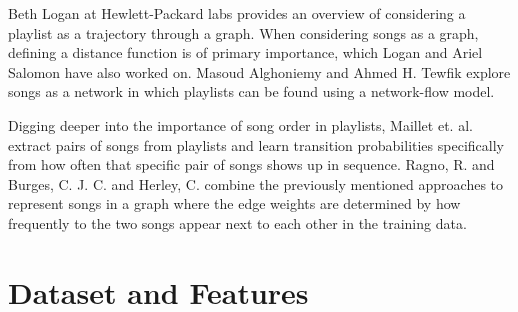 \documentclass[acmtog]{acmart}
\begin{document}
Beth Logan \cite{BethLogan} at Hewlett-Packard labs provides an overview of considering a playlist as a trajectory through a graph. When considering songs as a graph, defining a distance function is of primary importance, which Logan and Ariel Salomon \cite{LoganSalomon} have also worked on. Masoud Alghoniemy and Ahmed H. Tewfik \cite{Alghoniemy01anetwork} explore songs as a network in which playlists can be found using a network-flow model.

Digging deeper into the importance of song order in playlists, Maillet et. al. \cite{Maillet09steerableplaylist} extract pairs of songs from playlists and learn transition probabilities specifically from how often that specific pair of songs shows up in sequence. Ragno, R. and Burges, C. J. C. and Herley, C. \cite{Ragno:2005:ISM:1101826.1101840} combine the previously mentioned approaches to represent songs in a graph where the edge weights are determined by how frequently to the two songs appear next to each other in the training data.

\section{Dataset and Features}
\end{document}
